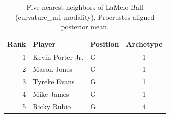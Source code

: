 \begin{table}[htbp]
  \centering\small
  \begin{tabular}{rllc}
    \toprule
    Rank & Player & Position & Archetype \\
    \midrule
    1 & Kevin Porter Jr. & G & 1 \\
    2 & Mason Jones & G & 1 \\
    3 & Tyreke Evans & G & 1 \\
    4 & Mike James & G & 1 \\
    5 & Ricky Rubio & G & 4 \\
    \bottomrule
  \end{tabular}
  \caption{Five nearest neighbors of LaMelo Ball (curvature_m1 modality), Procrustes-aligned posterior mean.}
  \label{tab:LaMelo_Ball_neighbors_curvature_m1}
\end{table}

